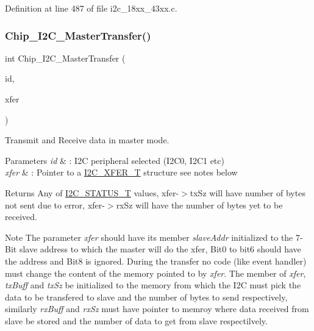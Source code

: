 Definition at line 487 of file i2c\+\_\+18xx\+\_\+43xx.\+c.

\mbox{\label{group___i2_c__18_x_x__43_x_x_ga5f89391d66048894f4365d3b2b7df267}} 
\subsubsection{\texorpdfstring{Chip\+\_\+\+I2\+C\+\_\+\+Master\+Transfer()}{Chip\_I2C\_MasterTransfer()}}
{\footnotesize\ttfamily int Chip\+\_\+\+I2\+C\+\_\+\+Master\+Transfer (\begin{DoxyParamCaption}\item[{\hyperlink{group___i2_c__18_x_x__43_x_x_ga957556a4d900506cd4cba8427afd81e6}{I2\+C\+\_\+\+I\+D\+\_\+T}}]{id,  }\item[{\hyperlink{struct_i2_c___x_f_e_r___t}{I2\+C\+\_\+\+X\+F\+E\+R\+\_\+T} $\ast$}]{xfer }\end{DoxyParamCaption})}



Transmit and Receive data in master mode. 


\begin{DoxyParams}{Parameters}
{\em id} & \+: I2C peripheral selected (I2\+C0, I2\+C1 etc) \\
\hline
{\em xfer} & \+: Pointer to a \hyperlink{struct_i2_c___x_f_e_r___t}{I2\+C\+\_\+\+X\+F\+E\+R\+\_\+T} structure see notes below \\
\hline
\end{DoxyParams}
\begin{DoxyReturn}{Returns}
Any of \hyperlink{group___i2_c__18_x_x__43_x_x_ga21aa839302786105dcf6a96be0e6e8bc}{I2\+C\+\_\+\+S\+T\+A\+T\+U\+S\+\_\+T} values, xfer-\/$>$tx\+Sz will have number of bytes not sent due to error, xfer-\/$>$rx\+Sz will have the number of bytes yet to be received. 
\end{DoxyReturn}
\begin{DoxyNote}{Note}
The parameter {\itshape xfer} should have its member {\itshape slave\+Addr} initialized to the 7-\/\+Bit slave address to which the master will do the xfer, Bit0 to bit6 should have the address and Bit8 is ignored. During the transfer no code (like event handler) must change the content of the memory pointed to by {\itshape xfer}. The member of {\itshape xfer}, {\itshape tx\+Buff} and {\itshape tx\+Sz} be initialized to the memory from which the I2C must pick the data to be transfered to slave and the number of bytes to send respectively, similarly {\itshape rx\+Buff} and {\itshape rx\+Sz} must have pointer to memroy where data received from slave be stored and the number of data to get from slave respectilvely. 
\end{DoxyNote}


